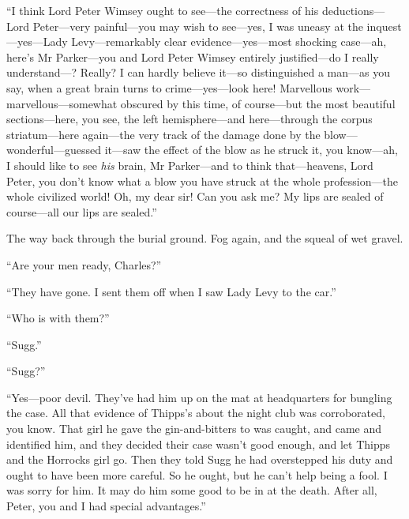 \enquote{I think Lord Peter Wimsey ought to see\allowbreak---\allowbreak the correctness of his deductions\allowbreak---\allowbreak Lord Peter\allowbreak---\allowbreak very painful\allowbreak---\allowbreak you may wish to see\allowbreak---\allowbreak yes, I was uneasy at the inquest\allowbreak---\allowbreak yes---Lady Levy\allowbreak---\allowbreak remarkably clear evidence\allowbreak---\allowbreak yes---most shocking case\allowbreak---\allowbreak ah, here’s Mr Parker\allowbreak---\allowbreak you and Lord Peter Wimsey entirely justified\allowbreak---\allowbreak do I really under\-stand---? Really? I can hardly believe it\allowbreak---\allowbreak so distinguished a man\allowbreak---\allowbreak as you say, when a great brain turns to crime\allowbreak---\allowbreak yes---look here! Marvellous work\allowbreak---\allowbreak marvellous---somewhat obscured by this time, of course\allowbreak---\allowbreak but the most beautiful sections\allowbreak---\allowbreak here, you see, the left hemisphere\allowbreak---\allowbreak and here\allowbreak---\allowbreak through the corpus striatum\allowbreak---\allowbreak here again\allowbreak---\allowbreak the very track of the damage done by the blow\allowbreak---\allowbreak wonderful---guessed it\allowbreak---\allowbreak saw the effect of the blow as he struck it, you know\allowbreak---\allowbreak ah, I should like to see \textit{his} brain, Mr Parker\allowbreak---\allowbreak and to think that\allowbreak---\allowbreak heavens, Lord Peter, you don’t know what a blow you have struck at the whole profession\allowbreak---\allowbreak the whole civilized world! Oh, my dear sir! Can you ask me? My lips are sealed of course\allowbreak---\allowbreak all our lips are sealed.}

The way back through the burial ground. Fog again, and the squeal of wet gravel.

\enquote{Are your men ready, Charles?}

\enquote{They have gone. I sent them off when I saw Lady Levy to the car.}

\enquote{Who is with them?}

\enquote{Sugg.}

\enquote{Sugg?}

\enquote{Yes\allowbreak---\allowbreak poor devil. They’ve had him up on the mat at headquarters for bungling the case. All that evidence of Thipps’s about the night club was corroborated, you know. That girl he gave the gin-and-bitters to was caught, and came and identified him, and they decided their case wasn’t good enough, and let Thipps and the Horrocks girl go. Then they told Sugg he had overstepped his duty and ought to have been more careful. So he ought, but he can’t help being a fool. I was sorry for him. It may do him some good to be in at the death. After all, Peter, you and I had special advantages.}


